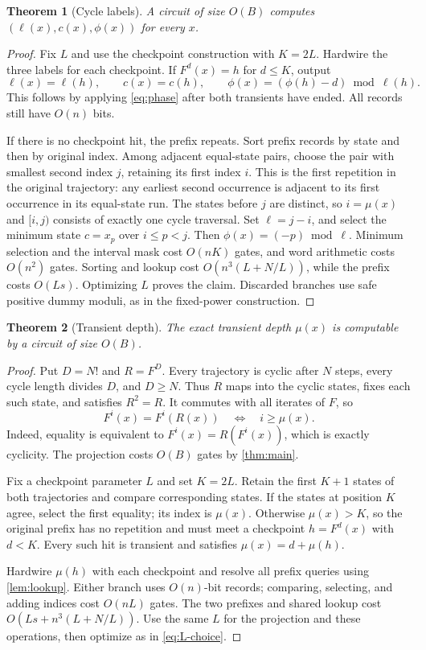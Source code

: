 \documentclass[11pt]{article}
\newtheorem{theorem}{Theorem}[section]
\theoremstyle{definition}
\theoremstyle{remark}
\numberwithin{equation}{section}
\begin{document}
\begin{theorem}[Cycle labels]\label{thm:labels}
A circuit of size $O(B)$ computes $(\ell(x),c(x),\phi(x))$ for every $x$.
\end{theorem}
\begin{proof}
Fix $L$ and use the checkpoint construction with $K=2L$.  Hardwire the
three labels for each checkpoint.  If $F^d(x)=h$ for $d\leq K$, output
\[
 \ell(x)=\ell(h),\qquad c(x)=c(h),\qquad
 \phi(x)=(\phi(h)-d)\bmod\ell(h).
\]
This follows by applying \cref{eq:phase} after both transients have ended.
All records still have $O(n)$ bits.

If there is no checkpoint hit, the prefix repeats.  Sort prefix records
by state and then by original index.  Among adjacent equal-state pairs,
choose the pair with smallest second index $j$, retaining its first
index $i$.  This is the first repetition in the original trajectory:
any earliest second occurrence is adjacent to its first occurrence in
its equal-state run.  The states before $j$ are distinct, so
$i=\mu(x)$ and $[i,j)$ consists of exactly one cycle traversal.
Set $\ell=j-i$, and select the minimum state $c=x_p$ over $i\leq p<j$.
Then $\phi(x)=(-p)\bmod\ell$.  Minimum selection and the interval mask
cost $O(nK)$ gates, and word arithmetic costs $O(n^2)$ gates.
Sorting and lookup cost $O(n^3(L+N/L))$, while the prefix costs $O(Ls)$.
Optimizing $L$ proves the claim.  Discarded branches use safe positive
dummy moduli, as in the fixed-power construction.
\end{proof}

\begin{theorem}[Transient depth]\label{thm:depth}
The exact transient depth $\mu(x)$ is computable by a circuit of size $O(B)$.
\end{theorem}
\begin{proof}
Put $D=N!$ and $R=F^D$.  Every trajectory is cyclic after $N$ steps,
every cycle length divides $D$, and $D\geq N$.  Thus $R$ maps into the
cyclic states, fixes each such state, and satisfies $R^2=R$.  It commutes
with all iterates of $F$, so
\begin{equation}\label{eq:projection-depth}
 F^i(x)=F^i(R(x))\quad\Longleftrightarrow\quad i\geq\mu(x).
\end{equation}
Indeed, equality is equivalent to $F^i(x)=R(F^i(x))$, which is exactly
cyclicity.  The projection costs $O(B)$ gates by \cref{thm:main}.

Fix a checkpoint parameter $L$ and set $K=2L$.  Retain the first $K+1$
states of both trajectories and compare corresponding states.  If the
states at position $K$ agree, select the first equality; its index is
$\mu(x)$.  Otherwise $\mu(x)>K$, so the original prefix has no repetition
and must meet a checkpoint $h=F^d(x)$ with $d<K$.  Every such hit is
transient and satisfies $\mu(x)=d+\mu(h)$.

Hardwire $\mu(h)$ with each checkpoint and resolve all prefix queries
using \cref{lem:lookup}.  Either branch uses $O(n)$-bit records; comparing,
selecting, and adding indices cost $O(nL)$ gates.  The two prefixes and
shared lookup cost $O(Ls+n^3(L+N/L))$.  Use the same $L$ for the projection
and these operations, then optimize as in \cref{eq:L-choice}.
\end{proof}
\end{document}
